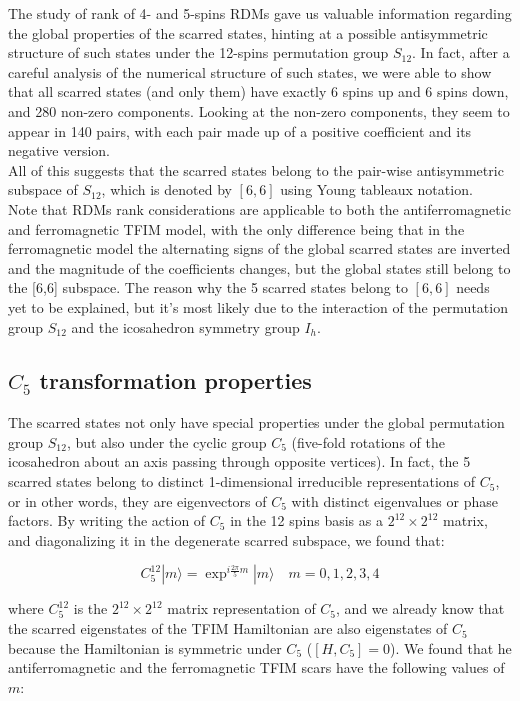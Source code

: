 \documentclass{article}
\begin{document}
The study of rank of 4- and 5-spins RDMs gave us valuable information regarding the global properties of the scarred states, hinting at a possible antisymmetric structure of such states under the 12-spins permutation group $S_{12}$. In fact, after a careful analysis of the numerical structure of such states, we were able to show that all scarred states (and only them) have exactly 6 spins up and 6 spins down, and 280 non-zero components. Looking at the non-zero components, they seem to appear in 140 pairs, with each pair made up of a positive coefficient and its negative version.\\
All of this suggests that the scarred states belong to the pair-wise antisymmetric subspace of $S_{12}$, which is denoted by $[6,6]$ using Young tableaux notation.\\
Note that RDMs rank considerations are applicable to both the antiferromagnetic and ferromagnetic TFIM model, with the only difference being that in the ferromagnetic model the alternating signs of the global scarred states are inverted and the magnitude of the coefficients changes, but the global states still belong to the [6,6] subspace.
The reason why the 5 scarred states belong to $[6,6]$ needs yet to be explained, but it's most likely due to the interaction of the permutation group $S_{12}$ and the icosahedron symmetry group $I_h$. 
 
\subsection{$C_5$ transformation properties}

The scarred states not only have special properties under the global permutation group $S_{12}$, but also under the cyclic group $C_5$ (five-fold rotations of the icosahedron about an axis passing through opposite vertices). In fact, the 5 scarred states belong to distinct 1-dimensional irreducible representations of $C_5$, or in other words, they are eigenvectors of $C_5$ with distinct eigenvalues or phase factors. By writing the action of $C_5$ in the 12 spins basis as a $2^{12}\times2^{12}$ matrix, and diagonalizing it in the degenerate scarred subspace, we found that:

\begin{equation}
C^{12}_5 |m\rangle = \exp^{i \frac{2\pi}{5} m} |m\rangle \quad m = 0,1,2,3,4
\end{equation} 

where $C^{12}_5$ is the $2^{12}\times2^{12}$ matrix representation of $C_5$, and we already know that the scarred eigenstates of the TFIM Hamiltonian are also eigenstates of $C_5$ because the Hamiltonian is symmetric under $C_5$ ($[H,C_5]=0$). We found that he antiferromagnetic and the ferromagnetic TFIM scars have the following values of $m$:
\end{document}

